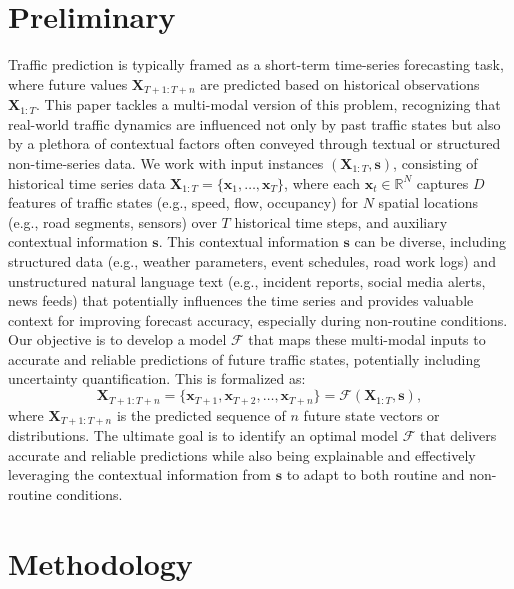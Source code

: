 \documentclass{article}
\begin{document}
\section{Preliminary}
Traffic prediction is typically framed as a short-term time-series forecasting task, where future values $\mathbf{X}_{T+1:T+n}$ are predicted based on historical observations $\mathbf{X}_{1:T}$. This paper tackles a multi-modal version of this problem, recognizing that real-world traffic dynamics are influenced not only by past traffic states but also by a plethora of contextual factors often conveyed through textual or structured non-time-series data. We work with input instances $(\mathbf{X}_{1:T}, \mathbf{s})$, consisting of historical time series data $\mathbf{X}_{1:T} = \{\mathbf{x}_1, \ldots, \mathbf{x}_T\}$, where each $\mathbf{x}_t \in \mathbb{R}^N$ captures $D$ features of traffic states (e.g., speed, flow, occupancy) for $N$ spatial locations (e.g., road segments, sensors) over $T$ historical time steps, and auxiliary contextual information $\mathbf{s}$. This contextual information $\mathbf{s}$ can be diverse, including structured data (e.g., weather parameters, event schedules, road work logs) and unstructured natural language text (e.g., incident reports, social media alerts, news feeds) that potentially influences the time series and provides valuable context for improving forecast accuracy, especially during non-routine conditions. Our objective is to develop a model $\mathcal{F}$ that maps these multi-modal inputs to accurate and reliable predictions of future traffic states, potentially including uncertainty quantification. This is formalized as:
\begin{equation} \label{eq:1}
    \mathbf{X}_{T+1:T+n} = \{\mathbf{x}_{T+1}, \mathbf{x}_{T+2}, \ldots, \mathbf{x}_{T+n}\} = \mathcal{F}(\mathbf{X}_{1:T}, \mathbf{s}),
\end{equation}
where $\mathbf{X}_{T+1:T+n}$ is the predicted sequence of $n$ future state vectors or distributions. The ultimate goal is to identify an optimal model $\mathcal{F}$ that delivers accurate and reliable predictions while also being explainable and effectively leveraging the contextual information from $\mathbf{s}$ to adapt to both routine and non-routine conditions.

\section{Methodology}
\end{document}
